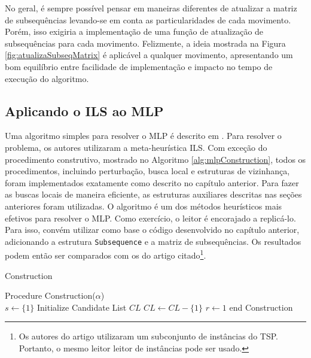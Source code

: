 No geral, é sempre possível pensar em maneiras diferentes de atualizar a matriz de subsequências levando-se em conta as particularidades de cada movimento. Porém, isso exigiria a implementação de uma função de atualização de subsequências para cada movimento. Felizmente, a ideia mostrada na Figura \ref{fig:atualizaSubseqMatrix} é aplicável a qualquer movimento, apresentando um bom equilíbrio entre facilidade de implementação e impacto no tempo de execução do algoritmo.

\subsection{Aplicando o ILS ao MLP}
Uma algoritmo simples para resolver o MLP é descrito em \cite{SILVA2012513}. Para resolver o problema, os autores utilizaram a meta-heurística ILS. Com exceção do procedimento construtivo, mostrado no Algoritmo \ref{alg:mlpConstruction}, todos os procedimentos, incluindo perturbação, busca local e estruturas de vizinhança, foram implementados exatamente como descrito no capítulo anterior. Para fazer as buscas locais de maneira eficiente, as estruturas auxiliares descritas nas seções anteriores foram utilizadas. O algoritmo é um dos métodos heurísticos mais efetivos para resolver o MLP. Como exercício, o leitor é encorajado a replicá-lo. Para isso, convém utilizar como base o código desenvolvido no capítulo anterior, adicionando a estrutura \texttt{Subsequence} e a matriz de subsequências. Os resultados podem então ser comparados com os do artigo citado\footnote{Os autores do artigo utilizaram um subconjunto de instâncias do TSP. Portanto, o mesmo leitor leitor de instâncias pode ser usado.}.

\begin{algorithm}[!ht]
    \DontPrintSemicolon
   \caption{Construction} \label{alg:mlpConstruction}
   Procedure Construction($\alpha$)\\
    $s \gets \{1\}$\; \label{SI:solucao}
    Initialize Candidate List $CL$\; \label{SI:lista}
    $CL \leftarrow CL - \{1\}$\; \label{SI:listasemdeposito}
    $r \leftarrow 1$\;
     \label{SI:fim}
   end Construction
\end{algorithm}

